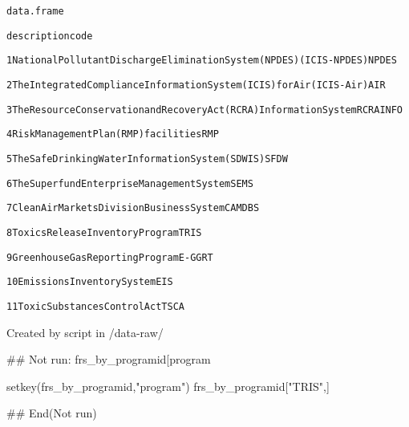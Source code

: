 \documentclass[a4paper]{book}
\begin{document}
%
\begin{Description}\relax
\begin{alltt}data.frame

                                                              description     code
                                                              
1    National Pollutant Discharge Elimination System (NPDES) (ICIS-NPDES)    NPDES

2  The Integrated Compliance Information System (ICIS) for Air (ICIS-Air)      AIR

3    The Resource Conservation and Recovery Act (RCRA) Information System RCRAINFO

4                                   Risk Management Plan (RMP) facilities      RMP

5                      The Safe Drinking Water Information System (SDWIS)     SFDW

6                              The Superfund Enterprise Management System     SEMS

7                              Clean Air Markets Division Business System   CAMDBS

8                                        Toxics Release Inventory Program     TRIS

9                                        Greenhouse Gas Reporting Program   E-GGRT

10                                             Emissions Inventory System      EIS

11                                           Toxic Substances Control Act     TSCA
\end{alltt}

\end{Description}
%
\begin{Details}\relax
Created by script in /data-raw/
\end{Details}
%
\begin{SeeAlso}\relax
{}
\end{SeeAlso}
%
\begin{Examples}
\begin{ExampleCode}
## Not run: 
  frs_by_programid[program %
  
  setkey(frs_by_programid,"program")
  frs_by_programid["TRIS",]
  
## End(Not run)
\end{ExampleCode}
\end{Examples}
\end{document}
